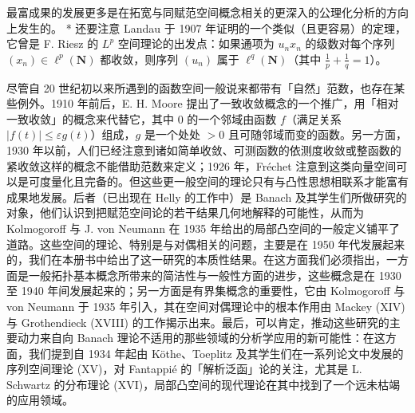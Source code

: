 最富成果的发展更多是在拓宽与同赋范空间概念相关的更深入的公理化分析的方向上发生的。
* 还要注意 Landau 于 1907 年证明的一个类似（且更容易）的定理，它曾是 F. Riesz 的 \(L^p\) 空间理论的出发点：如果通项为 \(u_n x_n\) 的级数对每个序列 \((x_n)\in \ell^p(\mathbf N)\) 都收敛，则序列 \((u_n)\) 属于 \(\ell^q(\mathbf N)\)（其中 \(\frac{1}{p}+\frac{1}{q}=1\)）。







尽管自 20 世纪初以来所遇到的函数空间一般说来都带有「自然」范数，也存在某些例外。1910 年前后，E. H. Moore 提出了一致收敛概念的一个推广，用「相对一致收敛」的概念来代替它，其中 0 的一个邻域由函数 \(f\)（满足关系 \(|f(t)| \leqslant \varepsilon g(t)\)）组成，\(g\) 是一个处处 \(>0\) 且可随邻域而变的函数。另一方面，1930 年以前，人们已经注意到诸如简单收敛、可测函数的依测度收敛或整函数的紧收敛这样的概念不能借助范数来定义；1926 年，Fréchet 注意到这类向量空间可以是可度量化且完备的。但这些更一般空间的理论只有与凸性思想相联系才能富有成果地发展。后者（已出现在 Helly 的工作中）是 Banach 及其学生们所做研究的对象，他们认识到把赋范空间论的若干结果几何地解释的可能性，从而为 Kolmogoroff 与 J. von Neumann 在 1935 年给出的局部凸空间的一般定义铺平了道路。这些空间的理论、特别是与对偶相关的问题，主要是在 1950 年代发展起来的，我们在本册书中给出了这一研究的本质性结果。在这方面我们必须指出，一方面是一般拓扑基本概念所带来的简洁性与一般性方面的进步，这些概念是在 1930 至 1940 年间发展起来的；另一方面是有界集概念的重要性，它由 Kolmogoroff 与 von Neumann 于 1935 年引入，其在空间对偶理论中的根本作用由 Mackey (XIV) 与 Grothendieck (XVIII) 的工作揭示出来。最后，可以肯定，推动这些研究的主要动力来自向 Banach 理论不适用的那些领域的分析学应用的新可能性：在这方面，我们提到自 1934 年起由 Köthe、Toeplitz 及其学生们在一系列论文中发展的序列空间理论 (XV)，对 Fantappié 的「解析泛函」论的关注，尤其是 L. Schwartz 的分布理论 (XVI)，局部凸空间的现代理论在其中找到了一个远未枯竭的应用领域。

